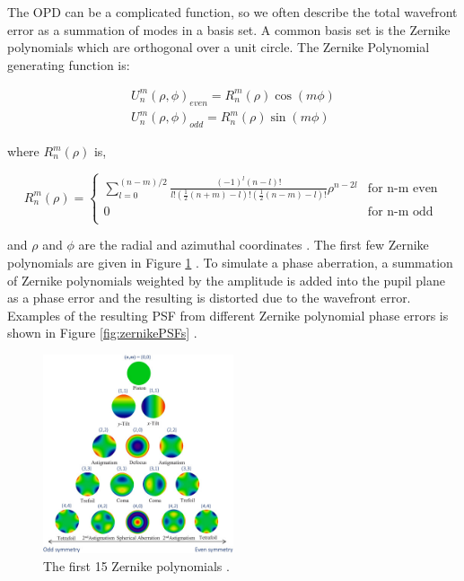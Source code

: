The OPD can be a complicated function, so we often describe the total wavefront error as a summation of modes in a basis set. A common basis set is the Zernike polynomials which are orthogonal over a unit circle. The Zernike Polynomial generating function is:

\begin{equation}
    \begin{split}
        U_n^m(\rho,\phi)_{even}=R_n^m(\rho)\cos(m\phi) \\
        U_n^m(\rho,\phi)_{odd}=R_n^m(\rho)\sin(m\phi)
    \end{split}
\end{equation}

\noindent where $R_n^m(\rho)$ is,

\[ 
R_n^m(\rho)= \left\{
\begin{array}{cr}
       {\sum_{l=0}^{(n-m)/2} \frac{(-1)^l(n-l)!}{l!(\frac{1}{2}(n+m)-l)!(\frac{1}{2}(n-m)-l)!}\rho^{n-2l}} &  \mbox{for n-m even} \\
        {0} &  \mbox{for n-m odd} \\
\end{array} 
\right. 
\]

\noindent and $\rho$ and $\phi$ are the radial and azimuthal coordinates \citep{weisstein2002zernike}. The first few Zernike polynomials are given in Figure \ref{fig:zernikes} \citep{Hsieh:20}. To simulate a phase aberration, a summation of Zernike polynomials weighted by the amplitude is added into the pupil plane as a phase error and the resulting is distorted due to the wavefront error. Examples of the resulting PSF from different Zernike polynomial phase errors is shown in Figure \ref{fig:zernikePSFs} \citep{masalehdan2010modeling}.

\begin{figure}[h]
    \centering
    \includegraphics[width=0.5\textwidth]{Chapter Materials/Introduction Materials/Introduction Figures/zernikes.jpeg}
    \caption{The first 15 Zernike polynomials \citep{Hsieh:20}.}
    \label{fig:zernikes}
\end{figure}


